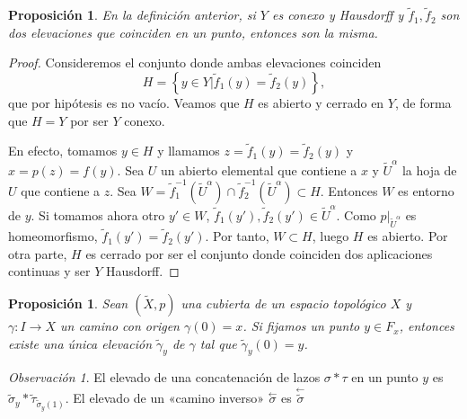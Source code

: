 \documentclass[12pt,a4paper]{book}
\newtheorem{prop}[thm]{Proposición}
\theoremstyle{definition} \newtheorem{defn}[thm]{Definición}
\theoremstyle{definition} \newtheorem{ejemplo}[thm]{Ejemplo}
\theoremstyle{definition} \newtheorem{ejercicio}[thm]{Ejercicio}
\theoremstyle{remark} \newtheorem*{obs}{Observación}
\def\XX{\tilde{X}}
\newcommand\cev[1]{\overset{\leftarrow}{#1}}
\begin{document}
\begin{prop}\label{coinciden}
  En la definición anterior, si $Y$ es conexo y Hausdorff y $\tilde{f}_1,\tilde{f}_2$ son dos elevaciones que coinciden en un punto, entonces son la misma.
\end{prop}
\begin{proof}
  Consideremos el conjunto donde ambas elevaciones coinciden
  \begin{equation*}
    H=\left\{ y\in Y | \tilde{f}_1(y)=\tilde{f}_2(y) \right\},
  \end{equation*}
  que por hipótesis es no vacío. Veamos que $H$ es abierto y cerrado en $Y$, de forma que $H=Y$ por ser $Y$ conexo.

  En efecto, tomamos $y\in H$ y llamamos $z=\tilde{f}_1(y)=\tilde{f}_2(y)$ y $x=p(z)=f(y)$. Sea $U$ un abierto elemental que contiene a $x$ y $\tilde{U}^{\alpha}$ la hoja de $U$ que contiene a $z$. Sea $W=\tilde{f}_1^{-1}(\tilde{U}^{\alpha}) \cap \tilde{f}_2^{-1}(\tilde{U}^{\alpha})\subset H$. Entonces $W$ es entorno de $y$. Si tomamos ahora otro $y'\in W$, $\tilde{f}_1(y'),\tilde{f}_2(y') \in \tilde{U}^{\alpha}$. Como $p|_{\tilde{U}^{\alpha}}$ es homeomorfismo, $\tilde{f}_1(y')=\tilde{f}_2(y')$. Por tanto, $W\subset H$, luego $H$ es abierto.
  Por otra parte, $H$ es cerrado por ser el conjunto donde coinciden dos aplicaciones continuas y ser $Y$ Hausdorff.
\end{proof}

\begin{prop}
  Sean $(\XX,p)$ una cubierta de un espacio topológico $X$ y $\gamma:I\rightarrow X$ un camino con origen $\gamma(0)=x$. Si fijamos un punto $y\in F_{x}$, entonces existe una única elevación $\tilde{\gamma}_{y}$ de $\gamma$ tal que $\tilde{\gamma}_{y}(0)=y$. 
\end{prop}

\begin{obs}
  El elevado de una concatenación de lazos $\sigma*\tau$ en un punto $y$ es $\tilde{\sigma}_y*\tilde{\tau}_{\tilde{\sigma}_y(1)}$. El elevado de un «camino inverso» $\cev{\sigma}$ es $\cev{\tilde{\sigma}}$
\end{obs}
\end{document}
